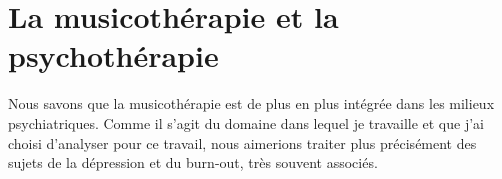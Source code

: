 \chapter{La musicothérapie et la psychothérapie}

Nous savons que la musicothérapie est de plus en plus intégrée dans
les milieux psychiatriques.  Comme il s'agit du domaine dans lequel je
travaille et que j'ai choisi d'analyser pour ce travail, nous
aimerions traiter plus précisément des sujets de la dépression et du
burn-out, très souvent associés.


